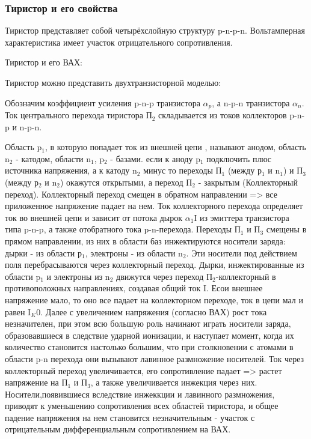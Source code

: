 \subsubsection{Тиристор и его свойства}

Тиристор представляет собой четырёхслойную структуру p-n-p-n. Вольтамперная характеристика имеет участок отрицательного сопротивления. 

Тиристор и его ВАХ:
\begin{center}
	\begin{figure}[h!]
		\caption{}	
	\end{figure}
\end{center}

Тиристор можно представить двухтранзисторной моделью:
\begin{center}
	\begin{figure}[h!]
		\caption{}	
	\end{figure}
\end{center}


Обозначим коэффициент усиления p-n-p транзистора $\alpha_p$, а n-p-n транзистора $\alpha_n$. Ток центрального перехода тиристора П$_2$ складывается из токов коллекторов p-n-p и n-p-n. 

Область p$_1$, в которую попадает ток из внешней цепи , называют анодом, область n$_2$  - катодом, области n$_1$, p$_2$ - базами. если к аноду p$_1$ подключить плюс источника напряжения, а к катоду n$_2$ минус то переходы П$_1$ (между р$_1$ и n$_1$) и  П$_3$ (между р$_2$ и n$_2$) окажутся открытыми, а переход П$_2$ - закрытым (Коллекторный переход). Коллекторный переход смещен в обратном направлении => все приложенное напряжение падает на нем. Ток коллекторного перехода определяет ток во внешней цепи и зависит от потока дырок $\alpha_1$I из эмиттера транзистора типа p-n-p, а также отобратного тока p-n-перехода. Переходы П$_1$ и П$_3$ смещены в прямом направлении, из них в области баз инжектируются носители заряда: дырки - из области р$_1$, электроны - из области n$_2$. Эти носители под действием поля перебрасываются через коллекторный переход. Дырки, инжектированные из области p$_1$ и электроны из n$_2$ движутся через переход П$_2$-коллекторный в противоположных направлениях, создавая общий ток I. Есои внешнее напряжение мало, то оно все падает на коллекторном переходе, ток в цепи мал и равен I$_K0$. Далее с увеличением напряжения (согласно ВАХ) рост тока незначителен, при этом всю большую роль начинают играть носители заряда, образовавшиеся в следствие ударной ионизации, и наступает момент, когда их количество становится настолько большим, что при столкновении с атомами в области p-n перехода они вызывают лавинное размножение носителей. Ток через коллекторный переход увеличивается, его сопротивление падает => растет напряжение на П$_1$ и П$_3$, а также увеличивается инжекция через них. Носители,появившиеся вследствие инжеккции и лавинного размножения, приводят к уменьшению сопротивления всех областей тиристора, и общее падение напряжения на нем становится незначительным - участок с отрицательным дифференциальным сопротивлением на ВАХ.

